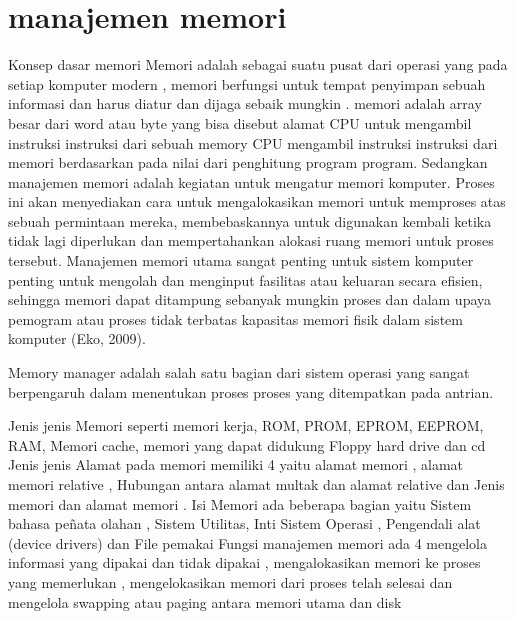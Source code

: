  \section {manajemen memori}
Konsep dasar memori
Memori adalah sebagai suatu pusat dari operasi yang pada setiap komputer modern , memori berfungsi untuk tempat penyimpan sebuah informasi dan harus diatur dan dijaga sebaik mungkin . memori adalah array besar dari word atau byte yang bisa disebut alamat CPU untuk mengambil instruksi instruksi dari sebuah memory
CPU mengambil instruksi instruksi dari memori berdasarkan pada nilai dari penghitung program  program.
Sedangkan manajemen memori adalah kegiatan untuk mengatur memori komputer. Proses ini akan menyediakan cara untuk mengalokasikan memori untuk memproses atas sebuah  permintaan mereka, membebaskannya untuk digunakan kembali ketika tidak lagi diperlukan dan mempertahankan alokasi ruang memori untuk proses tersebut. Manajemen memori utama sangat penting untuk sistem komputer  penting untuk mengolah dan menginput fasilitas atau keluaran secara efisien, sehingga memori dapat ditampung sebanyak mungkin proses dan dalam upaya pemogram atau proses tidak terbatas kapasitas memori fisik dalam sistem komputer (Eko, 2009).

Memory manager adalah salah satu bagian dari sistem operasi yang sangat berpengaruh dalam menentukan proses proses yang ditempatkan pada antrian.

Jenis jenis Memori seperti memori kerja, ROM, PROM, EPROM, EEPROM, RAM, Memori cache, memori yang dapat didukung
Floppy hard drive dan cd
Jenis jenis Alamat pada memori memiliki 4 yaitu alamat memori , alamat memori relative , Hubungan antara alamat multak dan alamat relative dan Jenis memori dan alamat memori .
Isi Memori ada beberapa bagian yaitu Sistem bahasa peñata olahan , Sistem Utilitas, Inti Sistem Operasi , Pengendali alat (device drivers) dan File pemakai
Fungsi manajemen memori ada 4 mengelola informasi yang dipakai dan tidak dipakai , mengalokasikan memori ke proses yang memerlukan , mengelokasikan memori dari proses telah selesai dan mengelola swapping atau paging antara memori utama dan disk 



